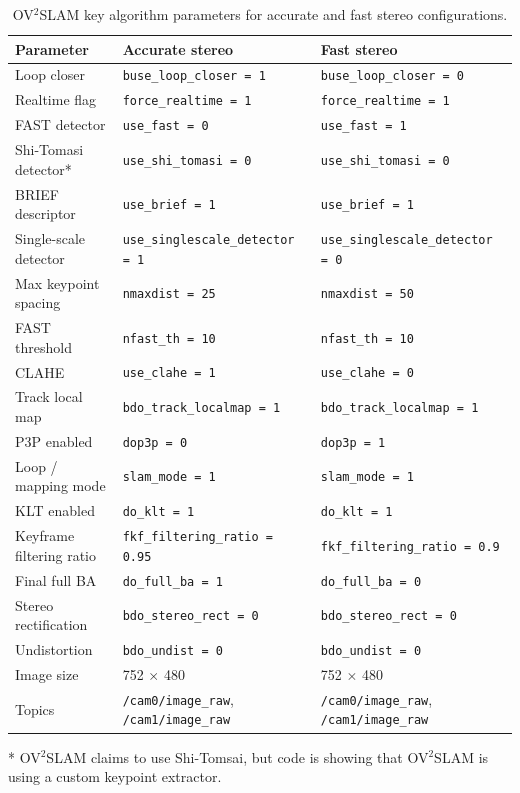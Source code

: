 \documentclass[11pt]{article}
\begin{document}
\begin{table}[H]
\centering
\small
\caption{OV$^{2}$SLAM key algorithm parameters for accurate and fast stereo configurations.}
\label{tab:ov2_algorithm_params}
\begin{tabular}{lp{4.6cm}p{4.6cm}}
\toprule
Parameter & Accurate stereo & Fast stereo \\
\midrule
Loop closer & \texttt{buse\_loop\_closer = 1} & \texttt{buse\_loop\_closer = 0} \\
Realtime flag & \texttt{force\_realtime = 1} & \texttt{force\_realtime = 1} \\
FAST detector & \texttt{use\_fast = 0} & \texttt{use\_fast = 1} \\
Shi-Tomasi detector* & \texttt{use\_shi\_tomasi = 0} & \texttt{use\_shi\_tomasi = 0} \\
BRIEF descriptor & \texttt{use\_brief = 1} & \texttt{use\_brief = 1} \\
Single-scale detector & \texttt{use\_singlescale\_detector = 1} & \texttt{use\_singlescale\_detector = 0} \\
Max keypoint spacing & \texttt{nmaxdist = 25} & \texttt{nmaxdist = 50} \\
FAST threshold & \texttt{nfast\_th = 10} & \texttt{nfast\_th = 10} \\
CLAHE & \texttt{use\_clahe = 1} & \texttt{use\_clahe = 0} \\
Track local map & \texttt{bdo\_track\_localmap = 1} & \texttt{bdo\_track\_localmap = 1} \\
P3P enabled & \texttt{dop3p = 0} & \texttt{dop3p = 1} \\
Loop / mapping mode & \texttt{slam\_mode = 1} & \texttt{slam\_mode = 1} \\
KLT enabled & \texttt{do\_klt = 1} & \texttt{do\_klt = 1} \\
Keyframe filtering ratio & \texttt{fkf\_filtering\_ratio = 0.95} & \texttt{fkf\_filtering\_ratio = 0.9} \\
Final full BA & \texttt{do\_full\_ba = 1} & \texttt{do\_full\_ba = 0} \\
Stereo rectification & \texttt{bdo\_stereo\_rect = 0} & \texttt{bdo\_stereo\_rect = 0} \\
Undistortion & \texttt{bdo\_undist = 0} & \texttt{bdo\_undist = 0} \\
Image size & 752 $\times$ 480 & 752 $\times$ 480 \\
Topics & \texttt{/cam0/image\_raw}, \texttt{/cam1/image\_raw} & \texttt{/cam0/image\_raw}, \texttt{/cam1/image\_raw} \\
\bottomrule
\end{tabular}
\end{table}
* OV$^{2}$SLAM claims to use Shi-Tomsai, but code is showing that OV$^{2}$SLAM is using a custom keypoint extractor.
\end{document}

